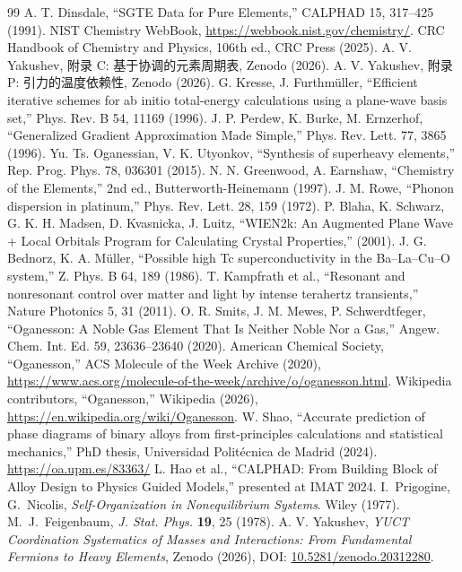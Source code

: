 \documentclass[11pt,a4paper]{article}
\begin{document}
	\begin{thebibliography}{99}
		 A. T. Dinsdale, ``SGTE Data for Pure Elements,'' CALPHAD 15, 317–425 (1991).
		 NIST Chemistry WebBook, \url{https://webbook.nist.gov/chemistry/}.
		 CRC Handbook of Chemistry and Physics, 106th ed., CRC Press (2025).
		 A. V. Yakushev, 附录 C: 基于协调的元素周期表, Zenodo (2026).
		 A. V. Yakushev, 附录 P: 引力的温度依赖性, Zenodo (2026).
		 G. Kresse, J. Furthmüller, ``Efficient iterative schemes for ab initio total-energy calculations using a plane-wave basis set,'' Phys. Rev. B 54, 11169 (1996).
		 J. P. Perdew, K. Burke, M. Ernzerhof, ``Generalized Gradient Approximation Made Simple,'' Phys. Rev. Lett. 77, 3865 (1996).
		 Yu. Ts. Oganessian, V. K. Utyonkov, ``Synthesis of superheavy elements,'' Rep. Prog. Phys. 78, 036301 (2015).
		 N. N. Greenwood, A. Earnshaw, ``Chemistry of the Elements,'' 2nd ed., Butterworth-Heinemann (1997).
		 J. M. Rowe, ``Phonon dispersion in platinum,'' Phys. Rev. Lett. 28, 159 (1972).
		 P. Blaha, K. Schwarz, G. K. H. Madsen, D. Kvasnicka, J. Luitz, ``WIEN2k: An Augmented Plane Wave + Local Orbitals Program for Calculating Crystal Properties,'' (2001).
		 J. G. Bednorz, K. A. Müller, ``Possible high Tc superconductivity in the Ba–La–Cu–O system,'' Z. Phys. B 64, 189 (1986).
		 T. Kampfrath et al., ``Resonant and nonresonant control over matter and light by intense terahertz transients,'' Nature Photonics 5, 31 (2011).
		 O. R. Smits, J. M. Mewes, P. Schwerdtfeger, ``Oganesson: A Noble Gas Element That Is Neither Noble Nor a Gas,'' Angew. Chem. Int. Ed. 59, 23636–23640 (2020).
		 American Chemical Society, ``Oganesson,'' ACS Molecule of the Week Archive (2020), \url{https://www.acs.org/molecule-of-the-week/archive/o/oganesson.html}.
		 Wikipedia contributors, ``Oganesson,'' Wikipedia (2026), \url{https://en.wikipedia.org/wiki/Oganesson}.
		 W. Shao, ``Accurate prediction of phase diagrams of binary alloys from first-principles calculations and statistical mechanics,'' PhD thesis, Universidad Politécnica de Madrid (2024). \url{https://oa.upm.es/83363/}
		 L. Hao et al., ``CALPHAD: From Building Block of Alloy Design to Physics Guided Models,'' presented at IMAT 2024.
		 I.~Prigogine, G.~Nicolis, \emph{Self-Organization in Nonequilibrium Systems}. Wiley (1977).
		 M.~J.~Feigenbaum, \emph{J. Stat. Phys.} \textbf{19}, 25 (1978).
		 A. V. Yakushev, \emph{YUCT Coordination Systematics of Masses and Interactions: From Fundamental Fermions to Heavy Elements}, Zenodo (2026), DOI: \href{https://doi.org/10.5281/zenodo.20312280}{10.5281/zenodo.20312280}.
	\end{thebibliography}
	
\end{document}
